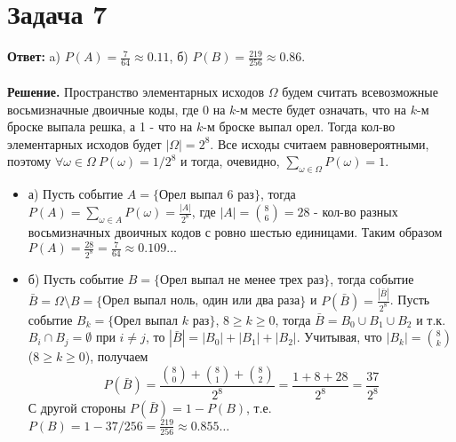 \documentclass{article}
\begin{document}
\section*{Задача 7}
{\bf Ответ:} a) $P(A)=\frac{7}{64}\approx 0.11$, б) $P(B)=\frac{219}{256}\approx0.86$.
\\
\\
{\bf Решение.} Пространство элементарных исходов $\Omega$ будем считать всевозможные восьмизначные двоичные коды, где 0 на $k$-м месте будет означать, что на $k$-м броске выпала решка, а 1 - что на $k$-м броске выпал орел. Тогда кол-во элементарных исходов будет $|\Omega|=2^8$. Все исходы считаем равновероятными, поэтому $\forall\omega\in\Omega\ P(\omega)=1/2^8$ и тогда, очевидно, $\sum_{\omega\in\Omega}P(\omega)=1$.
\begin{itemize}
\item а) Пусть событие $A=\{$Орел выпал 6 раз$\}$, тогда $P(A)=\sum_{\omega\in A}P(\omega)=\frac{|A|}{2^8}$, где $|A| = {8 \choose 6} = 28$ - кол-во разных восьмизначных двоичных кодов с ровно шестью единицами. Таким образом $P(A)=\frac{28}{2^8}=\frac{7}{64}\approx 0.109\dots$
\item б) Пусть событие $B=\{$Орел выпал не менее трех раз$\}$, тогда событие $\bar B=\Omega\setminus B=\{$Орел выпал ноль, один или два раза$\}$ и $P(\bar B)=\frac{|\bar B|}{2^8}$. Пусть событие $B_k=\{$Орел выпал $k$ раз$\}$, $8 \geq k \geq 0$, тогда $\bar B=B_0\cup B_1\cup B_2$ и т.к. $B_i\cap B_j = \emptyset$ при $i\neq j$, то $|\bar B| = |B_0|+|B_1|+|B_2|$. Учитывая, что $|B_k|={8 \choose k}$ ($8 \geq k \geq 0$), получаем $$P(\bar B)=\frac{{8 \choose 0} + {8 \choose 1} + {8 \choose 2}}{2^8}=\frac{1+8+28}{2^8}=\frac{37}{2^8}$$
С другой стороны $P(\bar B)=1 - P(B)$, т.е. $P(B)=1 - 37/256 = \frac{219}{256}\approx0.855\dots$
\end{itemize}
\end{document}
